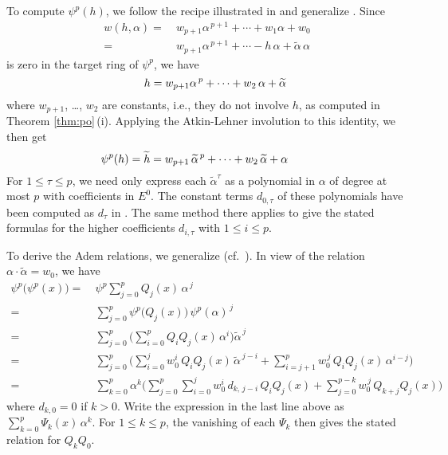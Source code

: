 \documentclass{gtpart}
\theoremstyle{definition}
\theoremstyle{remark}
\newcommand{\tA}{\widetilde{\A}}
\renewcommand{\th}{\widetilde{h}}
\newcommand{\A}{\alpha}
\newcommand{\T}{\tau}
\renewcommand{\=}{\approx}
\renewcommand{\-}{\sim}
\numberwithin{equation}{section}
\begin{document}
To compute $\psi^p(h)$, we follow the recipe illustrated in 
\cite[Example 3.4]{ho} and generalize \cite[proof of Proposition 6.4]{ho}.  
Since 
\[
 \begin{split}
  w(h,\A) = & ~ w_{p + 1} \A^{\,p + 1} + \cdots + w_1 \A + w_0 \\
          = & ~ w_{p + 1} \A^{\,p + 1} + \cdots - h \, \A + \tA \, \A 
 \end{split}
\]
is zero in the target ring of $\psi^p$, we have 
\[
 \hskip .5cm h = w_{p + 1} \A^{\,p} + \cdots + w_2 \, \A + \tA 
\]
where $w_{p + 1}$, \ldots, $w_2$ are constants, i.e., they do not involve $h$, 
as computed in Theorem \ref{thm:po}\,(i).  Applying the Atkin-Lehner involution 
to this identity, we then get 
\[
 \hskip -.8cm \psi^p(h) = \th = w_{p + 1} \, \tA^{\,p} + \cdots + w_2 \, \tA 
 + \A 
\]
For $1 \leq \T \leq p$, we need only express each $\tA^\T$ as a polynomial in 
$\A$ of degree at most $p$ with coefficients in $E^0$.  The constant terms 
$d_{0,\T}$ of these polynomials have been computed as $d_\T$ in 
\cite[proof of Proposition 6.4]{ho}.  The same method there applies to give the 
stated formulas for the higher coefficients $d_{i,\T}$ with $1 \leq i \leq p$.  

To derive the Adem relations, we generalize 
\cite[proof of Proposition 3.6\,(iv)]{p3} 
(cf.~\cite[proof of Proposition 6.4]{ho}).  
In view of the relation $\A \cdot \tA = w_0$, we have 
\[
 \begin{split}
  \psi^p\big(\psi^p(x)\big) = & ~ \psi^p \sum_{j = 0}^p Q_j(x) \, \A^{\,j} \\
                            = & ~ \sum_{j = 0}^p \psi^p\big(Q_j(x)\big) \, 
                                  \psi^p(\A)^{\,j} \\
                            = & ~ \sum_{j = 0}^p \Bigg( \sum_{i = 0}^p 
                                  Q_i Q_j(x) \, \A^i \Bigg) \tA^{\,j} \\
                            = & ~ \sum_{j = 0}^p \Bigg( \sum_{i = 0}^j w_0^i \, 
                                  Q_i Q_j(x) \, \tA^{\,j - i} 
                                + \sum_{i = j + 1}^p w_0^{\,j} \, Q_i Q_j(x) \, 
                                \A^{i - j} \Bigg) \\
                            = & ~ \sum_{k = 0}^p \A^k \Bigg( \sum_{j = 0}^p 
                                  \sum_{i = 0}^j w_0^i \, d_{k,\,j - i} \, 
                                  Q_i Q_j(x) + \sum_{j = 0}^{p - k} w_0^{\,j} \, 
                                  Q_{k + j} Q_j (x) \Bigg) 
 \end{split}
\]
where $d_{k,0} = 0$ if $k > 0$.  Write the expression in the last line above as 
$\sum_{k = 0}^p \Psi_k(x) \, \A^k$.  For $1 \leq k \leq p$, the vanishing of 
each $\Psi_k$ then gives the stated relation for $Q_k Q_0$.  
\end{document}
